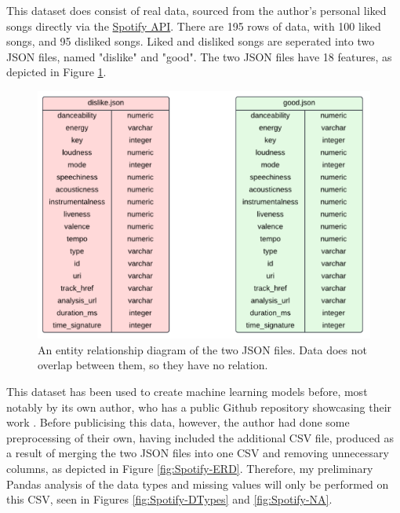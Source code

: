 \documentclass[12pt]{report}
\begin{document}
\noindent This dataset does consist of real data, sourced from the author's personal liked songs directly via the 
\href{https://developer.spotify.com/documentation/web-api}{Spotify API}. There are 195 rows of data, with 100 liked songs, and 95 disliked songs.
Liked and disliked songs are seperated into two JSON files, named "dislike" and "good". The two JSON files have 18 features, as depicted in Figure 
\ref{fig:JSON-ERD}. 

\begin{figure}[H]
    \centering
    \includegraphics[width=.75\linewidth]{SpotifyJSON-ERD.png}
    \caption{An entity relationship diagram of the two JSON files. Data does not overlap between them, so they have no relation.}
    \label{fig:JSON-ERD}
\end{figure}

This dataset has been used to create machine learning models before, most notably by its own author, who has a public Github repository 
showcasing their work \autocite{brice-vergnou_brice-vergnouspotify_recommendation_2024}. 
Before publicising this data, however, the author had done some preprocessing of their own, having included the additional CSV file,
produced as a result of merging the two JSON files into one CSV and removing unnecessary columns, as depicted in Figure \ref{fig:Spotify-ERD}.
Therefore, my preliminary Pandas analysis of the data types and missing values will only be performed on this CSV, seen in Figures \ref{fig:Spotify-DTypes}
and \ref{fig:Spotify-NA}.
\end{document}
